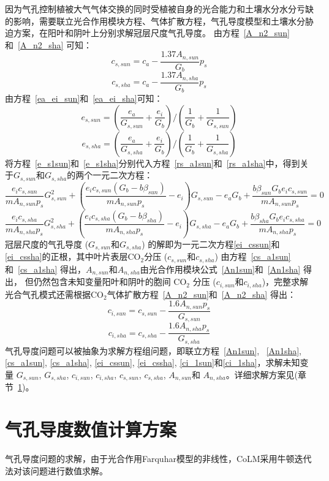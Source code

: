 因为气孔控制植被大气气体交换的同时受植被自身的光合能力和土壤水分水分亏缺的影响，需要联立光合作用模块方程、气体扩散方程，气孔导度模型和土壤水分胁迫方案，在阳叶和阴叶上分别求解冠层尺度气孔导度。
由方程~\eqref{A_n2_sun}和~\eqref{A_n2_sha} 可知：
\begin{equation}\label{cs_a1sun}
c_{s,sun}=c_{a}-\frac{1.37 A_{n,sun}}{G_{b}} p_{s}
\end{equation}
\begin{equation}\label{cs_a1sha}
c_{s,sha}=c_{a}-\frac{1.37 A_{n,sha}}{G_{b}} p_{s}
\end{equation}
由方程~\eqref{ea_ei_sun}和~\eqref{ea_ei_sha}可知：
\begin{equation}\label{e_s1sun}
e_{s,sun}=\left(\frac{e_{a}}{G_{s,sun}}+\frac{e_{i}}{G_{b}}\right) /\left(\frac{1}{G_{b}}+\frac{1}{G_{s,sun}}\right)
\end{equation}
\begin{equation}\label{e_s1sha}
e_{s,sha}=\left(\frac{e_{a}}{G_{s,sha}}+\frac{e_{i}}{G_{b}}\right) /\left(\frac{1}{G_{b}}+\frac{1}{G_{s,sha}}\right)
\end{equation}
将方程~\eqref{e_s1sun}和~\eqref{e_s1sha}分别代入方程~\eqref{rs_a1sun}和~\eqref{rs_a1sha}中，得到关于$G_{s,sun}$和$G_{s,sha}$的两个一元二次方程：
\begin{equation}\label{ei_cssun}
\frac{e_{i} c_{s,sun}}{m A_{n,sun} p_{s}} G_{s,sun}^{2}+\left(\frac{e_{i} c_{s,sun}\left(G_{b} -b \beta_{sun}\right)}{m A_{n,sun} p_{s}}-e_{i}\right) G_{s,sun}
-e_{a} G_{b}+\frac{b \beta_{sun} G_{b} e_{i} c_{s,sun}}{m A_{n,sun} p_{s}}=0
\end{equation}
\begin{equation}\label{ei_cssha}
\frac{e_{i} c_{s,sha}}{m A_{n,sha} p_{s}} G_{s,sha}^{2}+\left(\frac{e_{i} c_{s,sha}\left(G_{b} -b \beta_{sha}\right)}{m A_{n,sha} p_{s}}-e_{i}\right) G_{s,sha}
-e_{a} G_{b}+\frac{b \beta_{sha} G_{b} e_{i} c_{s,sha}}{m A_{n,sha} p_{s}}=0
\end{equation}
冠层尺度的气孔导度 ($G_{s,sun}$和$G_{s,sha}$) 的解即为一元二次方程\eqref{ei_cssun}和\eqref{ei_cssha}的正根，其中叶片表层$\mathrm{CO_2}$分压 ($c_{s,sun}$和$c_{s,sha}$) 由方程~\eqref{cs_a1sun}和~\eqref{cs_a1sha} 得出，$A_{n,sun}$和$A_{n,sha}$由光合作用模块公式~\eqref{An1sun}和~\eqref{An1sha} 得出，
但仍然包含未知变量阳叶和阴叶的胞间 $\mathrm{CO_2}$ 分压 ($c_{i,sun}$和$c_{i,sha}$)，完整求解光合气孔模式还需根据$\mathrm{CO_2}$气体扩散方程~\eqref{A_n2_sun}和~\eqref{A_n2_sha} 得出：
\begin{equation}\label{ci_1sun}
c_{i,sun}=c_{s,sun}-\frac{1.6 A_{n,sun} p_{s}}{G_{s,sun}}
\end{equation}
\begin{equation}\label{ci_1sha}
c_{i,sha}=c_{s,sha}-\frac{1.6 A_{n,sha} p_{s}}{G_{s,sha}}
\end{equation}
气孔导度问题可以被抽象为求解方程组问题，即联立方程~\eqref{An1sun}, ~\eqref{An1sha}, \eqref{cs_a1sun}, \eqref{cs_a1sha}, \eqref{ei_cssun}, \eqref{ei_cssha}, \eqref{ci_1sun}和\eqref{ci_1sha}，求解未知变量 $G_{s,sun}$, $G_{s,sha}$, $c_{i,sun}$, $c_{i,sha}$, $c_{s,sun}$, $c_{s,sha}$, $A_{n,sun}$和 $A_{n,sha}$。详细求解方案见(章节~\ref{气孔导度数值计算方案})。

\section{气孔导度数值计算方案}\label{气孔导度数值计算方案}
气孔导度问题的求解，由于光合作用Farquhar模型的非线性，CoLM采用牛顿迭代法对该问题进行数值求解。